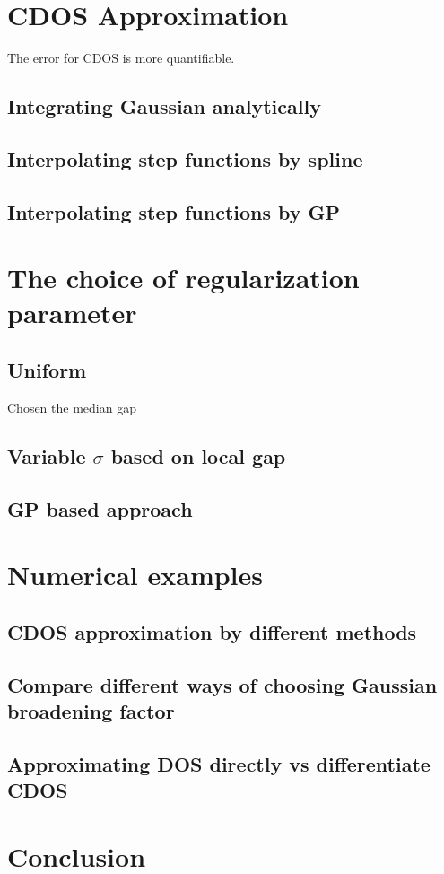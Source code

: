 \documentclass{article}
\begin{document}
\section{CDOS Approximation}
The error for CDOS is more quantifiable.
\subsection{Integrating Gaussian analytically}
\subsection{Interpolating step functions by spline}
\subsection{Interpolating step functions by GP}

\section{The choice of regularization parameter}
\subsection{Uniform}
Chosen the median gap
\subsection{Variable $\sigma$ based on local gap}
\subsection{GP based approach}

\section{Numerical examples}
\subsection{CDOS approximation by different methods}
\subsection{Compare different ways of choosing Gaussian broadening factor}
\subsection{Approximating DOS directly vs differentiate CDOS}

\section{Conclusion}


\end{document}
